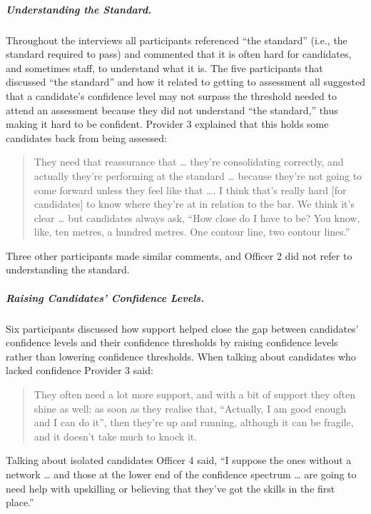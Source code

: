 \documentclass[
  12pt,
  a4paper,
]{book}
\begin{document}
\hypertarget{ml-qualitative-gta-understanding-the-standard}{%
\subparagraph{Understanding the Standard.}\label{ml-qualitative-gta-understanding-the-standard}}

Throughout the interviews all participants referenced ``the standard'' (i.e., the standard required to pass) and commented that it is often hard for candidates, and sometimes staff, to understand what it is. The five participants that discussed ``the standard'' and how it related to getting to assessment all suggested that a candidate's confidence level may not surpass the threshold needed to attend an assessment because they did not understand ``the standard,'' thus making it hard to be confident. Provider 3 explained that this holds some candidates back from being assessed:

\begin{quote}
They need that reassurance that \ldots{} they're consolidating correctly, and actually they're performing at the standard \ldots{} because they're not going to come forward unless they feel like that \ldots. I think that's really hard {[}for candidates{]} to know where they're at in relation to the bar. We think it's clear \ldots{} but candidates always ask, ``How close do I have to be? You know, like, ten metres, a hundred metres. One contour line, two contour lines.''
\end{quote}

Three other participants made similar comments, and Officer 2 did not refer to understanding the standard.

\hypertarget{raising-candidates-confidence-levels.}{%
\subparagraph{Raising Candidates' Confidence Levels.}\label{raising-candidates-confidence-levels.}}

Six participants discussed how support helped close the gap between candidates' confidence levels and their confidence thresholds by raising confidence levels rather than lowering confidence thresholds. When talking about candidates who lacked confidence Provider 3 said:

\begin{quote}
They often need a lot more support, and with a bit of support they often shine as well: as soon as they realise that, ``Actually, I am good enough and I can do it'', then they're up and running, although it can be fragile, and it doesn't take much to knock it.
\end{quote}

Talking about isolated candidates Officer 4 said, ``I suppose the ones without a network \ldots{} and those at the lower end of the confidence spectrum \ldots{} are going to need help with upskilling or believing that they've got the skills in the first place.''
\end{document}
